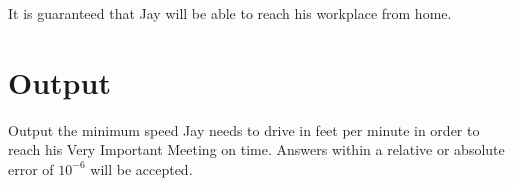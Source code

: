 It is guaranteed that Jay will be able to reach his workplace from home.

\section*{Output}

Output the minimum speed Jay needs to drive in feet per minute in order to reach his Very Important Meeting
on time. Answers within a relative or absolute error of $10^{-6}$ will be accepted.
